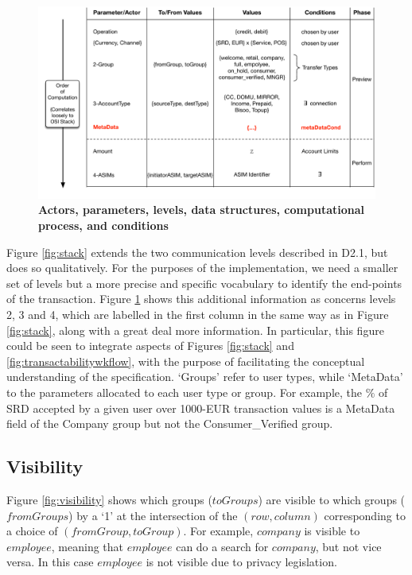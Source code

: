 \begin{figure}[htbp]
\centering
\includegraphics[width=17cm]{Figures/Vocabulary}
\caption{\small\textbf{Actors, parameters, levels, data structures, computational process, and conditions}}
\label{fig:vocabulary}
\end{figure}

Figure \ref{fig:stack} extends the two communication levels described in D2.1, but does so qualitatively. For the purposes of the implementation, we need a smaller set of levels but a more precise and specific vocabulary to identify the end-points of the transaction. Figure \ref{fig:vocabulary} shows this additional information as concerns levels 2, 3 and 4, which are labelled in the first column in the same way as in Figure \ref{fig:stack}, along with a great deal more information. In particular, this figure could be seen to integrate aspects of Figures \ref{fig:stack} and \ref{fig:transactabilitywkflow}, with the purpose of facilitating the conceptual understanding of the specification. `Groups' refer to user types, while `MetaData' to the parameters allocated to each user type or group. For example, the $\%$ of SRD accepted by a given user over 1000-EUR transaction values is a MetaData field of the Company group but not the Consumer\_Verified group.

\subsection{Visibility}
Figure \ref{fig:visibility} shows which groups ($toGroups$) are visible to which groups ($fromGroups$) by a `1' at the intersection of the $(row, column)$ corresponding to a choice of $(fromGroup, toGroup)$. For example, $company$ is visible to $employee$, meaning that $employee$ can do a search for $company$, but not vice versa. In this case $employee$ is not visible due to privacy legislation.

